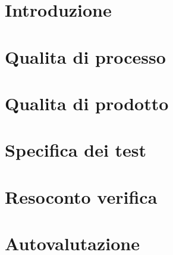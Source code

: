 \documentclass[a4paper, oneside, openany, dvipsnames, table]{article}
\begin{document}
    \copertina{}
    
    \newpage
    \tableofcontents
    \newpage
    \listoftables
    \newpage
    \listoffigures
    
    \newpage
    \section{Introduzione}\label{sec:Introduzione}
    
    
    \newpage
    \section{Qualita di processo}\label{sec:Qualita-di-processo}
    
    
    \newpage
    \section{Qualita di prodotto}\label{sec:Qualita-di-prodotto}
    
    
    \newpage
    \section{Specifica dei test}\label{sec:Specifica-dei-test}
    
    
    \newpage
    \section{Resoconto verifica}\label{sec:Resoconto-verifica}
    
    
    \newpage
    \section{Autovalutazione}\label{sec:Autovalutazione}
    
\end{document}
